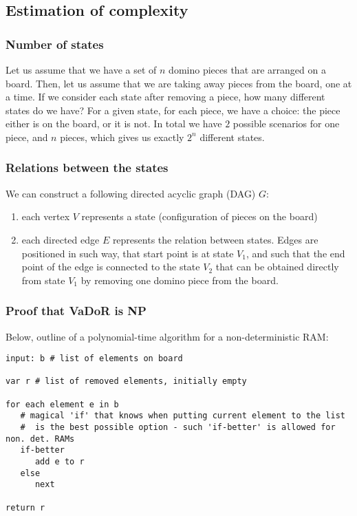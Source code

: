 \subsection{Estimation of complexity}

\subsubsection{Number of states}
Let us assume that we have a set of $n$ domino pieces that are arranged on a board. Then, 
let us assume that we are taking away pieces from the board, one at a time. If we consider each 
state after removing a piece, how many different states do we have? For a given state, for each piece, 
we have a choice: the piece either is on the board, or it is not. In total we have $2$ possible scenarios
for one piece, and $n$ pieces, which gives us exactly $2^n$ different states.

\subsubsection{Relations between the states}
We can construct a following directed acyclic graph (DAG) $G$:
\begin{enumerate}
  \item each vertex $V$ represents a state (configuration of pieces on the board)
  \item each directed edge $E$ represents the relation between states. Edges 
  are positioned in such way, that start point is at state $V_1$, and such that 
  the end point of the edge is connected to the state $V_2$ that can be obtained 
  directly from state $V_1$ by removing one domino piece from the board.
\end{enumerate}

\subsubsection{Proof that VaDoR is NP}

Below, outline of a polynomial-time algorithm for a non-deterministic RAM:

\begin{verbatim}
input: b # list of elements on board

var r # list of removed elements, initially empty

for each element e in b
   # magical 'if' that knows when putting current element to the list 
   #  is the best possible option - such 'if-better' is allowed for non. det. RAMs
   if-better 
      add e to r
   else
      next

return r

\end{verbatim}

